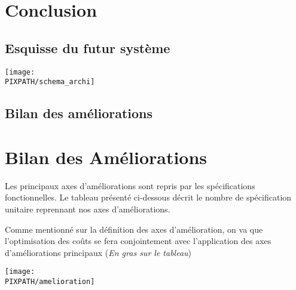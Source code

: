 \section{Conclusion}

\subsection{Esquisse du futur système}

\begin{center}
\texttt{[image: \\PIXPATH/schema\_archi]}
\end{center}

\subsection{Bilan des améliorations}

\section{Bilan des Améliorations}

Les principaux axes d'améliorations sont repris par les spécifications
fonctionnelles. Le tableau présenté ci-dessous décrit le nombre de
spécification unitaire reprennant nos axes d'améliorations. 

Comme mentionné sur la définition des axes d'amélioration, on va que
l'optimisation des coûts se fera conjointement avec l'application des axes
d'améliorations principaux (\textit{En gras sur le tableau})

\begin{center}
\texttt{[image: \\PIXPATH/amelioration]}
\end{center}



